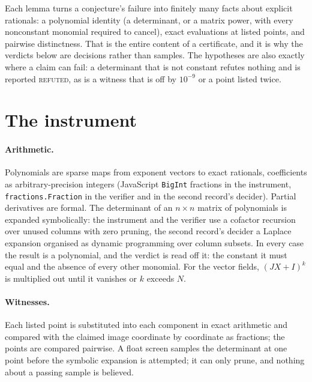 \documentclass[11pt]{article}
\newcommand{\verdict}[1]{\textsc{#1}}
\begin{document}
Each lemma turns a conjecture's failure into finitely many facts about explicit rationals: a
polynomial identity (a determinant, or a matrix power, with every nonconstant monomial required
to cancel), exact evaluations at listed points, and pairwise distinctness. That is the entire
content of a certificate, and it is why the verdicts below are decisions rather than samples. The
hypotheses are also exactly where a claim can fail: a determinant that is not constant refutes
nothing and is reported \verdict{refuted}, as is a witness that is off by $10^{-9}$ or a point
listed twice.

\section{The instrument}\label{sec:instrument}

\paragraph{Arithmetic.} Polynomials are sparse maps from exponent vectors to exact rationals,
coefficients as arbitrary-precision integers (JavaScript \texttt{BigInt} fractions in the
instrument, \texttt{fractions.Fraction} in the verifier and in the second record's decider).
Partial derivatives are formal. The determinant of an $n\times n$ matrix of polynomials is expanded
symbolically: the instrument and the verifier use a cofactor recursion over unused columns with
zero pruning, the second record's decider a Laplace expansion organised as dynamic programming
over column subsets. In every case the result is a polynomial, and the verdict is read off it:
the constant it must equal and the absence of every other monomial. For the vector fields,
$(JX+I)^k$ is multiplied out until it vanishes or $k$ exceeds $N$.

\paragraph{Witnesses.} Each listed point is substituted into each component in exact
arithmetic and compared with the claimed image coordinate by coordinate as fractions; the points
are compared pairwise. A float screen samples the determinant at one point before the symbolic
expansion is attempted; it can only prune, and nothing about a passing sample is believed.
\end{document}
